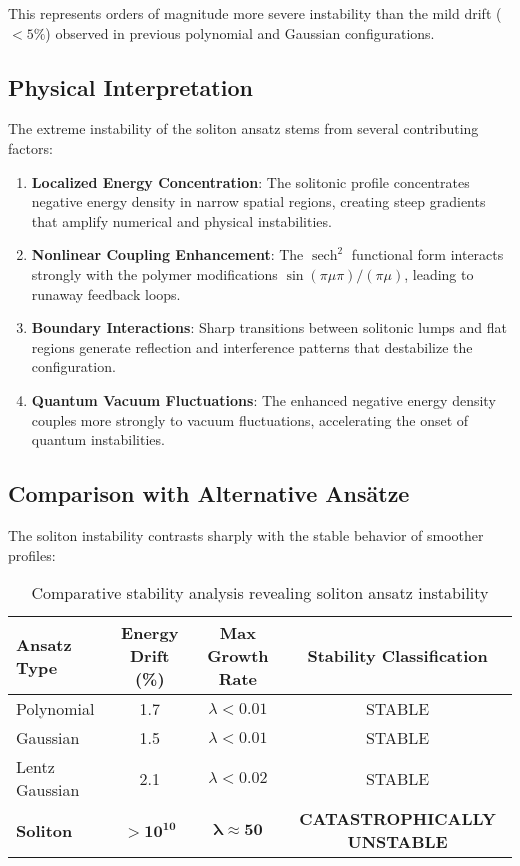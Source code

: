 \documentclass[11pt,a4paper]{article}
\begin{document}
This represents orders of magnitude more severe instability than the mild drift ($< 5\%$) observed in previous polynomial and Gaussian configurations.

\subsection{Physical Interpretation}

The extreme instability of the soliton ansatz stems from several contributing factors:

\begin{enumerate}
\item \textbf{Localized Energy Concentration}: The solitonic profile concentrates negative energy density in narrow spatial regions, creating steep gradients that amplify numerical and physical instabilities.

\item \textbf{Nonlinear Coupling Enhancement}: The $\operatorname{sech}^2$ functional form interacts strongly with the polymer modifications $\sin(\pi\mu\pi)/(\pi\mu)$, leading to runaway feedback loops.

\item \textbf{Boundary Interactions}: Sharp transitions between solitonic lumps and flat regions generate reflection and interference patterns that destabilize the configuration.

\item \textbf{Quantum Vacuum Fluctuations}: The enhanced negative energy density couples more strongly to vacuum fluctuations, accelerating the onset of quantum instabilities.
\end{enumerate}

\subsection{Comparison with Alternative Ansätze}

The soliton instability contrasts sharply with the stable behavior of smoother profiles:

\begin{table}[h]
\centering
\begin{tabular}{@{}lccc@{}}
\toprule
Ansatz Type & Energy Drift (\%) & Max Growth Rate & Stability Classification \\
\midrule
Polynomial & 1.7 & $\lambda < 0.01$ & STABLE \\
Gaussian & 1.5 & $\lambda < 0.01$ & STABLE \\
Lentz Gaussian & 2.1 & $\lambda < 0.02$ & STABLE \\
\textbf{Soliton} & $\mathbf{> 10^{10}}$ & $\boldsymbol{\lambda \approx 50}$ & \textbf{CATASTROPHICALLY UNSTABLE} \\
\bottomrule
\end{tabular}
\caption{Comparative stability analysis revealing soliton ansatz instability}
\end{table}
\end{document}
